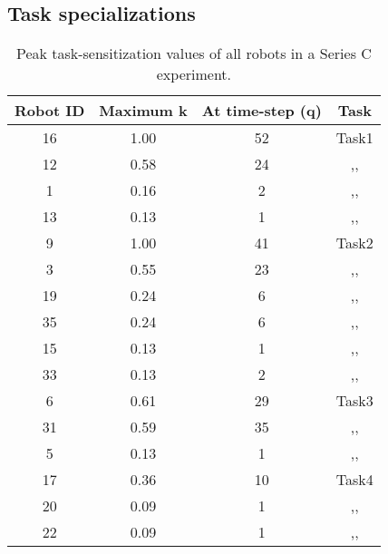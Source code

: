 \subsection*{Task specializations}
\begin{table}
\centering
\caption{Peak task-sensitization values of all robots in a Series C experiment.}
\begin{tabular}{|c|c|c|c|}
\hline\textbf{ Robot ID} & \textbf{Maximum k} & \textbf{At time-step (q)} & \textbf{Task} \\
\hline 16 & 1.00 & 52 & Task1\\
\hline 12 & 0.58 & 24 & ,,\\  
\hline 1 & 0.16 & 2 & ,,\\ 
\hline 13 & 0.13 & 1 & ,,\\
\hline 9 & 1.00 & 41 & Task2\\
\hline 3 & 0.55 & 23 & ,,\\ 
\hline 19 & 0.24 & 6 & ,,\\
\hline 35 & 0.24 & 6 & ,,\\
\hline 15 & 0.13 & 1 & ,,\\
\hline 33 & 0.13 & 2 & ,,\\ 
\hline 6 & 0.61 & 29 & Task3\\
\hline 31 & 0.59 & 35 & ,,\\ 
\hline 5 & 0.13 & 1 & ,,\\ 
\hline 17 & 0.36 & 10 & Task4\\
\hline 20 & 0.09 & 1 & ,,\\ 
\hline 22 & 0.09 & 1 & ,,\\ 
 \hline 
\end{tabular} 
\label{table:K-Q-SC}
\end{table}
